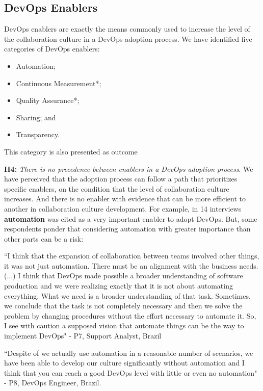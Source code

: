 \subsection{DevOps Enablers}

DevOps enablers are exactly the means commonly used to increase the level of the collaboration culture in a DevOps adoption process. We have identified five categories of DevOps enablers:

\begin{itemize}
\item Automation;
\item Continuous Measurement*;
\item Quality Assurance*;
\item Sharing; and
\item Transparency.
\end{itemize}

\footnotesize * This category is also presented as outcome

\normalsize
\textbf{H4:} \textit{There is no precedence between enablers in a DevOps
adoption process}. We have perceived that the adoption process can follow a
path that prioritizes specific enablers, on the condition that the level of
collaboration culture increases. And there is no enabler with evidence that
can be more efficient to another in collaboration culture development. For
example, in 14 interviews \textbf{automation} was cited as a very important
enabler to adopt DevOps. But, some respondents ponder that considering
automation with greater importance than other parts can be a risk:

``I think that the expansion of collaboration between teams involved other
things, it was not just automation. There must be an alignment with the
business needs. (...) I think that DevOps made possible a broader understanding
of software production and we were realizing exactly that it is not about
automating everything. What we need is a broader understanding of that task.
Sometimes, we conclude that the task is not completely necessary and then we
solve the problem by changing procedures without the effort necessary to
automate it. So, I see with caution a supposed vision that automate things can
be the way to implement DevOps" - P7, Support Analyst, Brazil

``Despite of we actually use automation in a reasonable number of scenarios, we have been able to develop our culture significantly without automation and I think that you can reach a good DevOps level with little or even no automation" - P8, DevOps Engineer, Brazil.

